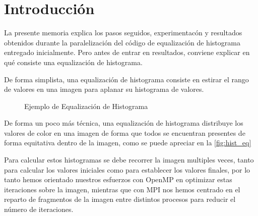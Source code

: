 \documentclass[12pt]{report} %
\begin{document}
\listoftables
\thispagestyle{fancy}

\clearpage
{} %

\chapter{Introducción}
\label{chap:Intro}

La presente memoria explica los pasos seguidos, experimentacón y resultados obtenidos durante la paralelización del código de equalización de histograma entregado inicialmente. Pero antes de entrar en resultados, conviene explicar en qué consiste una equalización de histograma.

De forma simplista, una equalización de histograma consiste en estirar el rango de valores en una imagen para aplanar su histograma de valores.

\begin{figure}[H]
    \caption{Ejemplo de Equalización de Histograma}
    \label{fig:hist_eq}
\end{figure}

De forma un poco más técnica, una equalización de histograma distribuye los valores de color en una imagen de forma que todos se encuentran presentes de forma equitativa dentro de la imagen, como se puede apreciar en la \autoref{fig:hist_eq}

Para calcular estos histogramas se debe recorrer la imagen multiples veces, tanto para calcular los valores iniciales como para establecer los valores finales, por lo tanto hemos orientado nuestros esfuerzos con OpenMP \parencite{timlewis_openmp_nodate} en optimizar estas iteraciones sobre la imagen, mientras que con MPI \parencite{noauthor_open_nodate} nos hemos centrado en el reparto de fragmentos de la imagen entre distintos procesos para reducir el número de iteraciones.
\end{document}
